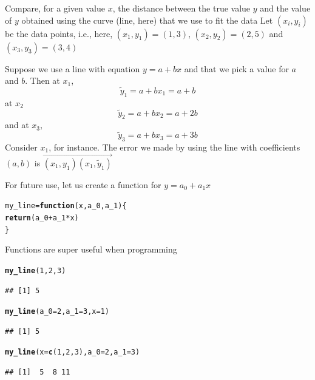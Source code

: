 \documentclass[aspectratio=169]{beamer}\usepackage[]{graphicx}\usepackage[]{xcolor}
\makeatletter
\newcommand{\hlnum}[1]{\textcolor[rgb]{0.686,0.059,0.569}{#1}}%
\newcommand{\hlopt}[1]{\textcolor[rgb]{0,0,0}{#1}}%
\newcommand{\hldef}[1]{\textcolor[rgb]{0.345,0.345,0.345}{#1}}%
\newcommand{\hlkwa}[1]{\textcolor[rgb]{0.161,0.373,0.58}{\textbf{#1}}}%
\newcommand{\hlkwb}[1]{\textcolor[rgb]{0.69,0.353,0.396}{#1}}%
\newcommand{\hlkwc}[1]{\textcolor[rgb]{0.333,0.667,0.333}{#1}}%
\newcommand{\hlkwd}[1]{\textcolor[rgb]{0.737,0.353,0.396}{\textbf{#1}}}%
\newenvironment{kframe}{%
 \def\at@end@of@kframe{}%
 \ifinner\ifhmode%
  \def\at@end@of@kframe{\end{minipage}}%
  \begin{minipage}{\columnwidth}%
 \fi\fi%
 \def\FrameCommand##1{\hskip\@totalleftmargin \hskip-\fboxsep
 \colorbox{shadecolor}{##1}\hskip-\fboxsep
     \hskip-\linewidth \hskip-\@totalleftmargin \hskip\columnwidth}%
 \MakeFramed {\advance\hsize-\width
   \@totalleftmargin\z@ \linewidth\hsize
   \@setminipage}}%
 {\par\unskip\endMakeFramed%
 \at@end@of@kframe}
\newenvironment{knitrout}{}{} %
\makeatother
\begin{document}
\begin{frame}
Compare, for a given value $x$, the distance between the true value $y$ and the value of $y$ obtained using the curve (line, here) that we use to fit the data
\vfill
Let $(x_i,y_i)$ be the data points, i.e., here, $(x_1,y_1)=(1,3)$, $(x_2,y_2)=(2,5)$ and $(x_3,y_3)=(3,4)$
\end{frame}

\begin{frame}
Suppose we use a line with equation $y=a+bx$ and that we pick a value for $a$ and $b$. Then at $x_1$,
$$
\tilde y_1 = a+bx_1 = a+b
$$
at $x_2$
$$
\tilde y_2 = a+bx_2 = a+2b
$$
and at $x_3$,
$$
\tilde y_3 = a+bx_3 = a+3b
$$
\vfill
Consider $x_1$, for instance. The error we made by using the line with coefficients $(a,b)$ is $\overrightarrow{(x_1,y_1)(x_1,\tilde y_1)}$
\end{frame}

\begin{frame}[fragile]
For future use, let us create a function for $y = a_0 + a_1x$

\begin{knitrout}
\color{fgcolor}\begin{kframe}
\begin{alltt}
\hldef{my_line} \hlkwb{=} \hlkwa{function}\hldef{(}\hlkwc{x}\hldef{,} \hlkwc{a_0}\hldef{,} \hlkwc{a_1}\hldef{)\{}
    \hlkwd{return}\hldef{(a_0} \hlopt{+} \hldef{a_1}\hlopt{*}\hldef{x)}
\hldef{\}}
\end{alltt}
\end{kframe}
\end{knitrout}

Functions are super useful when programming

\begin{knitrout}
\color{fgcolor}\begin{kframe}
\begin{alltt}
\hlkwd{my_line}\hldef{(}\hlnum{1}\hldef{,}\hlnum{2}\hldef{,}\hlnum{3}\hldef{)}
\end{alltt}
\begin{verbatim}
## [1] 5
\end{verbatim}
\begin{alltt}
\hlkwd{my_line}\hldef{(}\hlkwc{a_0} \hldef{=} \hlnum{2}\hldef{,} \hlkwc{a_1} \hldef{=} \hlnum{3}\hldef{,} \hlkwc{x} \hldef{=} \hlnum{1}\hldef{)}
\end{alltt}
\begin{verbatim}
## [1] 5
\end{verbatim}
\begin{alltt}
\hlkwd{my_line}\hldef{(}\hlkwc{x} \hldef{=} \hlkwd{c}\hldef{(}\hlnum{1}\hldef{,}\hlnum{2}\hldef{,}\hlnum{3}\hldef{),} \hlkwc{a_0} \hldef{=} \hlnum{2}\hldef{,} \hlkwc{a_1} \hldef{=} \hlnum{3}\hldef{)}
\end{alltt}
\begin{verbatim}
## [1]  5  8 11
\end{verbatim}
\end{kframe}
\end{knitrout}
\end{frame}
\end{document}
